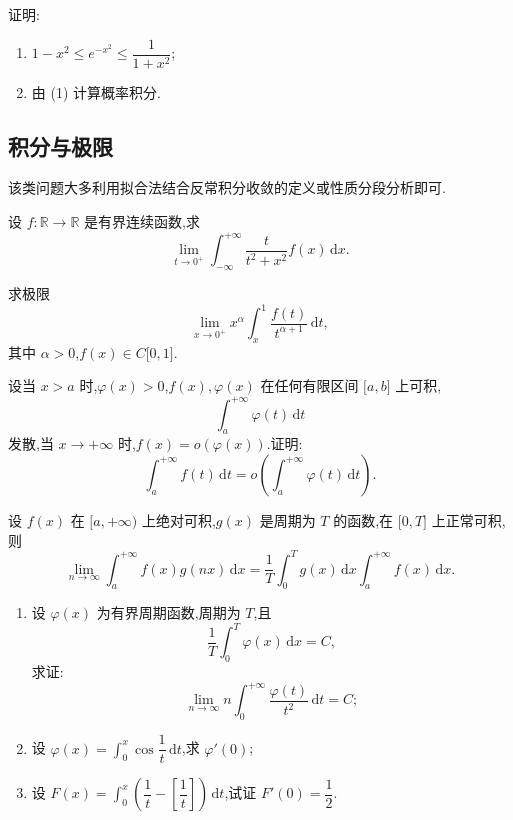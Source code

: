 \documentclass[../../数学分析培优讲义.tex]{subfiles}
\begin{document}
\begin{example}
证明:
\begin{enumerate}[label=(\arabic*)]
    \item $1-x^2\leq e^{-x^2}\leq\dfrac{1}{1+x^2}$;
    \item 由 (1) 计算概率积分.
\end{enumerate}
\end{example}
\exampleblank



\subsection{积分与极限}

该类问题大多利用拟合法结合反常积分收敛的定义或性质分段分析即可.

\begin{example}
设 $f:\mathbb{R}\to\mathbb{R}$ 是有界连续函数,求
\[
    \lim\limits_{t\to0^+}\int_{-\infty}^{+\infty}\dfrac{t}{t^2+x^2}f(x)\,\mathrm{d}x.
\]
\end{example}
\exampleblank

\begin{example}
求极限
\[
    \lim\limits_{x\to0^+}x^\alpha\int_x^1\dfrac{f(t)}{t^{\alpha+1}}\,\mathrm{d}t,
\]
其中 $\alpha>0$,$f(x)\in C\lbrack 0,1\rbrack$.
\end{example}
\exampleblank

\begin{example}
设当 $x>a$ 时,$\varphi(x)>0$,$f(x),\varphi(x)$ 在任何有限区间 $\lbrack a,b\rbrack$ 上可积,
\[
    \int_a^{+\infty}\varphi(t)\,\mathrm{d}t
\]
发散,当 $x\to+\infty$ 时,$f(x)=o(\varphi(x))$.证明:
\[
    \int_a^{+\infty}f(t)\,\mathrm{d}t
    =o\left(\int_a^{+\infty}\varphi(t)\,\mathrm{d}t\right).
\]
\end{example}
\exampleblank

\begin{proposition}
设 $f(x)$ 在 $\lbrack a,+\infty)$ 上绝对可积,$g(x)$ 是周期为 $T$ 的函数,在 $\lbrack 0,T\rbrack$ 上正常可积,则
\[
    \lim\limits_{n\to\infty}\int_a^{+\infty}f(x)g(nx)\,\mathrm{d}x
    =\dfrac{1}{T}\int_0^Tg(x)\,\mathrm{d}x\int_a^{+\infty}f(x)\,\mathrm{d}x.
\]
\end{proposition}

\begin{example}
\begin{enumerate}[label=(\arabic*)]
    \item 设 $\varphi(x)$ 为有界周期函数,周期为 $T$,且
    \[
        \dfrac{1}{T}\int_0^T\varphi(x)\,\mathrm{d}x=C,
    \]
    求证:
    \[
        \lim\limits_{n\to\infty}n\int_0^{+\infty}\dfrac{\varphi(t)}{t^2}\,\mathrm{d}t=C;
    \]
    \item 设 $\displaystyle\varphi(x)=\int_0^x\cos\dfrac{1}{t}\,\mathrm{d}t$,求 $\varphi'(0)$;
    \item 设 $\displaystyle F(x)=\int_0^x\left(\dfrac{1}{t}-\left[\dfrac{1}{t}\right]\right)\,\mathrm{d}t$,试证 $F'(0)=\dfrac{1}{2}$.
\end{enumerate}
\end{example}
\exampleblank
\end{document}

